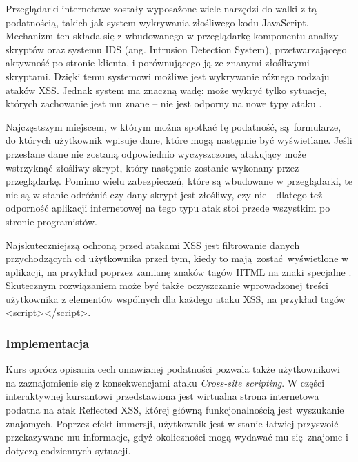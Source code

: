 \documentclass[12pt,twoside]{article}
\begin{document}
Przeglądarki internetowe zostały wyposażone wiele narzędzi do walki z tą podatnością, takich jak system wykrywania złośliwego kodu JavaScript. Mechanizm ten składa się z wbudowanego w przeglądarkę komponentu analizy skryptów oraz systemu IDS (ang. Intrusion Detection System), przetwarzającego aktywność po stronie klienta, i porównującego ją ze znanymi złośliwymi skryptami. Dzięki temu systemowi możliwe jest wykrywanie różnego rodzaju ataków XSS. Jednak system ma znaczną wadę: może wykryć tylko sytuacje, których zachowanie jest mu znane -- nie jest odporny na nowe typy ataku \cite{XSSProtection}. 

Najczęstszym miejscem, w którym można spotkać tę podatność, są formularze, do których użytkownik wpisuje dane, które mogą następnie być wyświetlane. Jeśli przesłane dane nie zostaną odpowiednio wyczyszczone, atakujący może wstrzyknąć złośliwy skrypt, który następnie zostanie wykonany przez przeglądarkę. Pomimo wielu zabezpieczeń, które są wbudowane w przeglądarki, te nie są w stanie odróżnić czy dany skrypt jest złośliwy, czy nie - dlatego też odporność aplikacji internetowej na tego typu atak stoi przede wszystkim po stronie programistów.
	
Najskuteczniejszą ochroną przed atakami XSS jest filtrowanie danych przychodzących od użytkownika przed tym, kiedy to mają zostać wyświetlone w aplikacji, na przykład poprzez zamianę znaków tagów HTML na znaki specjalne \cite{XSSSpecialTags}. Skutecznym rozwiązaniem może być także oczyszczanie wprowadzonej treści użytkownika z elementów wspólnych dla każdego ataku XSS, na przykład tagów <script></script>.
	
\subsubsection{Implementacja}

Kurs oprócz opisania cech omawianej podatności pozwala także użytkownikowi na zaznajomienie się z konsekwencjami ataku \emph{Cross-site scripting}. W części interaktywnej kursantowi przedstawiona jest wirtualna strona internetowa podatna na atak Reflected XSS, której główną funkcjonalnością jest wyszukanie znajomych. Poprzez efekt immersji, użytkownik jest w stanie łatwiej przyswoić przekazywane mu informacje, gdyż okoliczności mogą wydawać mu się znajome i dotyczą codziennych sytuacji.
\end{document}
